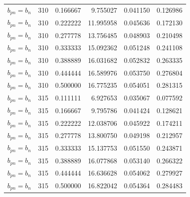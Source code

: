 \begin{longtable}{l r r r r r}
$b_{pn} = b_n$ & 310 & 0.166667 & 9.755027 & 0.041150 & 0.126986 \\
$b_{pn} = b_n$ & 310 & 0.222222 & 11.995958 & 0.045636 & 0.172130 \\
$b_{pn} = b_n$ & 310 & 0.277778 & 13.756485 & 0.048903 & 0.210498 \\
$b_{pn} = b_n$ & 310 & 0.333333 & 15.092362 & 0.051248 & 0.241108 \\
$b_{pn} = b_n$ & 310 & 0.388889 & 16.031682 & 0.052832 & 0.263335 \\
$b_{pn} = b_n$ & 310 & 0.444444 & 16.589976 & 0.053750 & 0.276804 \\
$b_{pn} = b_n$ & 310 & 0.500000 & 16.775235 & 0.054051 & 0.281315 \\
$b_{pn} = b_n$ & 315 & 0.111111 & 6.927653 & 0.035067 & 0.077592 \\
$b_{pn} = b_n$ & 315 & 0.166667 & 9.795786 & 0.041424 & 0.128621 \\
$b_{pn} = b_n$ & 315 & 0.222222 & 12.038706 & 0.045922 & 0.174211 \\
$b_{pn} = b_n$ & 315 & 0.277778 & 13.800750 & 0.049198 & 0.212957 \\
$b_{pn} = b_n$ & 315 & 0.333333 & 15.137753 & 0.051550 & 0.243871 \\
$b_{pn} = b_n$ & 315 & 0.388889 & 16.077868 & 0.053140 & 0.266322 \\
$b_{pn} = b_n$ & 315 & 0.444444 & 16.636628 & 0.054062 & 0.279927 \\
$b_{pn} = b_n$ & 315 & 0.500000 & 16.822042 & 0.054364 & 0.284483 \\
        \end{longtable}
